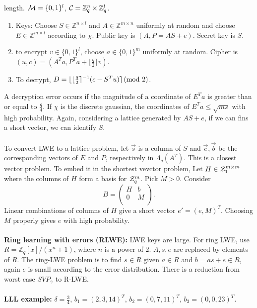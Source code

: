 length.  ${\cal M} = \{0, 1\}^l$, ${\cal C} = {\mathbb Z}_q^n \times {\mathbb Z}_q^l$.
\begin{enumerate}
\item Keys: Choose 
$S \in {\mathbb Z}^{n \times l}$ and 
$A \in {\mathbb Z}^{m \times n}$ uniformly at random and choose
$E \in {\mathbb Z}^{m \times l}$  according to $\chi$.  Public key is $(A, P=AS+e)$.  Secret key is $S$.
\item to encrypt $v \in \{ 0, 1\}^l$, choose $a \in \{0, 1 \}^m$ uniformly at random.  Cipher is
$(u,c) = (A^Ta, P^Ta + \lfloor {\frac q 2} \rceil v)$.
\item To decrypt, $D = \lfloor \lfloor {\frac q 2}\rceil^{-1} (c - S^Tu)\rceil \thinspace \textnormal{(mod } 2 \textnormal{)}$.
\end{enumerate}
A decryption error occurs if the magnitude of a coordinate of $E^Ta$ is greater than or equal to ${\frac q 4}$.
If $\chi$ is the discrete gaussian, the coordinates of $E^Ta \leq \sqrt{ms}$ with high probability.
Again, considering a lattice generated by $AS+e$, if we can fins a short vector, we can identify $S$.
\\
\\
To convert LWE to a lattice problem, let ${\vec s}$ is a column of $S$ and ${\vec e}, {\vec b}$ be
the corresponding vectors of $E$ and $P$, respectively in $\Lambda_q(A^T)$.  This is a closest vector problem.
To embed it in the shortest vevctor problem, Let $H \in {\cal Z}_1^{m \times m}$ where the columns of $H$ form a
basis for ${\cal Z}_q^m$.  Pick $M > 0$.  Consider 
$$
B = 
\left(
\begin{array}{cc}
H &  b \\
0 &  M \\
\end{array}
\right).
$$
Linear combinations of columns of $H$ give a short vector $e' = (e, M)^T$.  Choosing $M$ properly gives $e$ with high probability.
\\
\\
{\bf Ring learning with errors (RLWE): }
LWE keys are large.  For ring LWE, use $R = {\mathbb Z}_q[x]/(x^n + 1)$, where $n$ is a power of  $2$.
$A, s, e$ are replaced by elements of $R$.  The ring-LWE problem is
to find $s  \in R$ given $a \in R$ and $b = as+e \in R$, again $e$ is small according to the error distribution.
There is a reduction from worst case $SVP_{\gamma}$ to R-LWE.
\\
\\
{\bf LLL example: }  $\delta = {\frac 3 4}$, 
$b_1 = (2, 3, 14)^T$,
$b_2 = (0, 7, 11)^T$,
$b_3 = (0, 0, 23)^T$.
